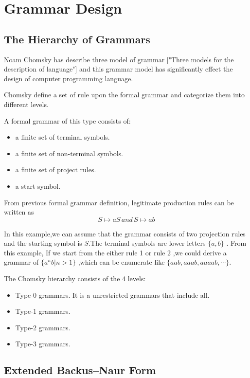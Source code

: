 \chapter{Grammar Design}


\section{The Hierarchy of Grammars}
Noam Chomsky has describe three model of grammar ["Three models for the description of language"]  and this grammar model has significantly effect the design of computer programming language.


Chomsky define a set of rule upon the formal grammar and categorize them into different levels.

A formal grammar of this type consists of:
\begin{itemize}
\item a finite set of terminal symbols.
\item a finite set of non-terminal symbols.
\item a finite set of project rules.
\item a start symbol.
\end{itemize}

From previous formal grammar definition, legitimate production rules can be written as 
 \[ S \mapsto aS  \,and \, S \mapsto ab \]
 
In this example,we can assume that the grammar consists of two projection rules and the starting symbol is $ S $.The terminal symbols are lower letters $ \{a ,b\} $ . From this example, If we start from the either rule 1 or rule 2 ,we could derive a  grammar of $ \{ a^n b | n>1  \}$ ,which can be enumerate like $ \{aab,aaab,aaaab,\cdots \} $.

The Chomsky hierarchy consists of the 4 levels:
\begin{itemize}
\item Type-0 grammars. It is a unrestricted grammars that include all.
\item Type-1 grammars.
\item Type-2 grammars.
\item Type-3 grammars.
\end{itemize}


\section {Extended Backus–Naur Form}

